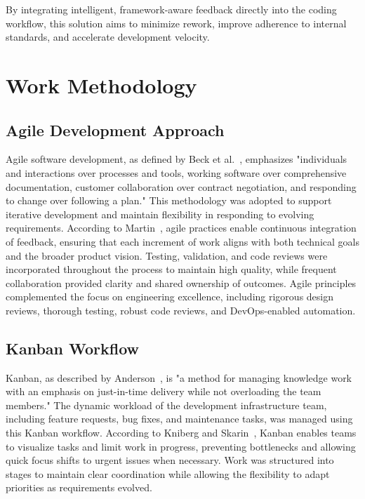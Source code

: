 \begin{spacing}{1.2}
By integrating intelligent, framework-aware feedback directly into the coding workflow, this solution aims to minimize rework, improve adherence to internal standards, and accelerate development velocity.  

\section{Work Methodology}

\subsection{Agile Development Approach}
Agile software development, as defined by Beck et al.~\cite{beck2001agile}, emphasizes "individuals and interactions over processes and tools, working software over comprehensive documentation, customer collaboration over contract negotiation, and responding to change over following a plan." This methodology was adopted to support iterative development and maintain flexibility in responding to evolving requirements. According to Martin~\cite{martin2003agile}, agile practices enable continuous integration of feedback, ensuring that each increment of work aligns with both technical goals and the broader product vision. Testing, validation, and code reviews were incorporated throughout the process to maintain high quality, while frequent collaboration provided clarity and shared ownership of outcomes. Agile principles complemented the focus on engineering excellence, including rigorous design reviews, thorough testing, robust code reviews, and DevOps-enabled automation.

\subsection{Kanban Workflow}
Kanban, as described by Anderson~\cite{anderson2010kanban}, is "a method for managing knowledge work with an emphasis on just-in-time delivery while not overloading the team members." The dynamic workload of the development infrastructure team, including feature requests, bug fixes, and maintenance tasks, was managed using this Kanban workflow. According to Kniberg and Skarin~\cite{kniberg2011kanban}, Kanban enables teams to visualize tasks and limit work in progress, preventing bottlenecks and allowing quick focus shifts to urgent issues when necessary. Work was structured into stages to maintain clear coordination while allowing the flexibility to adapt priorities as requirements evolved.  


\end{spacing}
